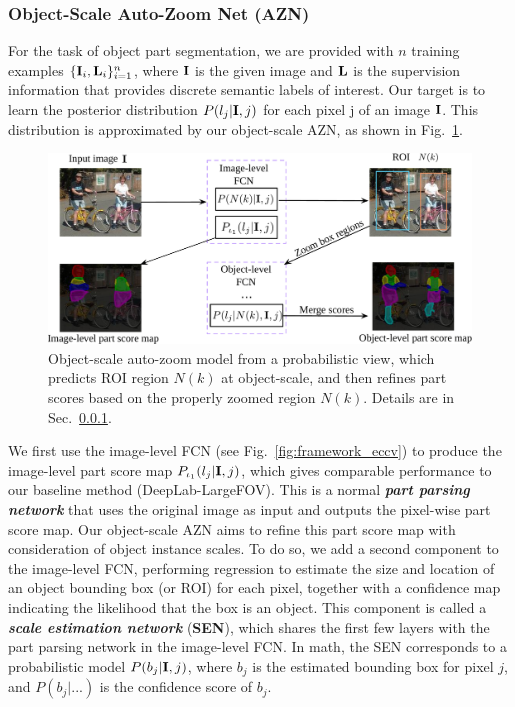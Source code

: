 \subsubsection{Object-Scale Auto-Zoom Net (AZN)}
\label{subsubsec:AZN}
For the task of object part segmentation, we are provided with $n$ training examples $\{{\mathbf I}_i, {\mathbf L}_i\}_{i=1}^{n}$, where ${\mathbf I}$ is the given image and ${\mathbf L}$ is the supervision information that provides discrete semantic labels of interest. Our target is to learn the posterior distribution $P(l_j | {\mathbf I},j)$ for each pixel j of an image ${\mathbf I}$. This distribution is approximated by our object-scale AZN, as shown in Fig.~\ref{fig:prob_model_eccv}.

\begin{figure}
\begin{center}
   \includegraphics[width=0.8\linewidth]{figs/prob_model_eccv.pdf}
\end{center}
 \caption{Object-scale auto-zoom model from a probabilistic view, which predicts ROI region $N(k)$ at object-scale, and then refines part scores based on the properly zoomed region $N(k)$. Details are in Sec.~\ref{subsubsec:AZN}.}
\label{fig:prob_model_eccv}
\end{figure}

We first use the image-level FCN (see Fig.~\ref{fig:framework_eccv}) to produce the image-level part score map $P_{\iota_1}(l_j | {\mathbf I},j)$, which gives comparable performance to our baseline method (DeepLab-LargeFOV). This is a normal \emph{\textbf{part parsing network}} that uses the original image as input and outputs the pixel-wise part score map. Our object-scale AZN aims to refine this part score map with consideration of object instance scales. To do so, we add a second component to the image-level FCN, performing regression to estimate the size and location of an object bounding box (or ROI) for each pixel, together with a confidence map indicating the likelihood that the box is an object. This component is called a \emph{\textbf{scale estimation network}} (\textbf{SEN}), which shares the first few layers with the part parsing network in the image-level FCN. In math, the SEN corresponds to a probabilistic model $P(b_j | {\mathbf I}, j)$, where $b_j$ is the estimated bounding box for pixel $j$, and $P(b_j|...)$ is the confidence score of $b_j$.

